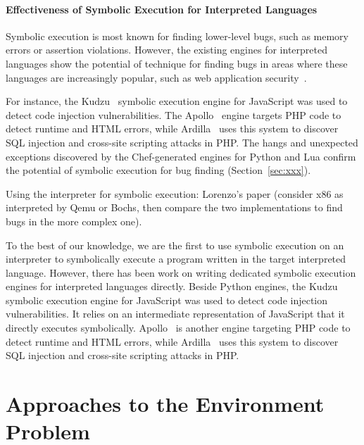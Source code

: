 \paragraph{Effectiveness of Symbolic Execution for Interpreted Languages}

Symbolic execution is most known for finding lower-level bugs, such as memory errors or assertion violations.  However, the existing engines for interpreted languages show the potential of technique for finding bugs in areas where these languages are increasingly popular, such as web application security~\cite{saxena-kudzu,artzi-apollo, kiezun-ardilla}.

For instance, the Kudzu~\cite{saxena-kudzu} symbolic execution engine for JavaScript was used to detect code injection vulnerabilities.  The Apollo~\cite{artzi-apollo} engine targets PHP code to detect runtime and HTML errors, while Ardilla~\cite{kiezun-ardilla} uses this system to discover SQL injection and cross-site scripting attacks in PHP.
%
The hangs and unexpected exceptions discovered by the Chef-generated engines for Python and Lua confirm the potential of symbolic execution for bug finding (Section~\ref{sec:xxx}).


Using the interpreter for symbolic execution: Lorenzo's paper (consider x86 as interpreted by Qemu or Bochs, then compare the two implementations to find bugs in the more complex one).

To the best of our knowledge, we are the first to use symbolic execution on an interpreter to symbolically execute a program written in the target interpreted language.  However, there has been work on writing dedicated symbolic execution engines for interpreted languages directly.  Beside Python engines, the Kudzu~\cite{saxena-kudzu} symbolic execution engine for JavaScript was used to detect code injection vulnerabilities. It relies on an intermediate representation of JavaScript that it directly executes symbolically.
%
Apollo~\cite{artzi-apollo} is another engine targeting PHP code to detect runtime and HTML errors, while Ardilla~\cite{kiezun-ardilla} uses this system to discover SQL injection and cross-site scripting attacks in PHP.



\section{Approaches to the Environment Problem}

